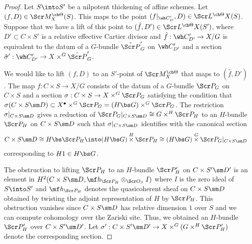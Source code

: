 \documentclass[final]{amsart}
\theoremstyle{remark}
\theoremstyle{definition}
\numberwithin{equation}{section}
\begin{document}
\begin{proof}
Let $S \into S'$ be a nilpotent thickening of affine schemes. 
Let $(f,D) \in \Scr M_X^{\ch\Theta}(S)$. 
This maps to the point $(f|_{\wh C'_D}, D) \in \Scr L^{\ch\Theta} X(S)$. 
Suppose that we have a lift of this point to 
$(\hat f, D') \in \Scr L^{\ch\Theta} X(S')$, where 
$D'\subset C\times S'$ is a relative effective Cartier divisor
and $\hat f: \wh C'_{D'} \to X/G$ is equivalent to 
the datum of a $G$-bundle $\hat{\Scr P}'_G$ on $\wh C'_{D'}$
and a section $\hat \sigma' : \wh C'_{D'} \to X \times^G \hat{\Scr P}'_G$.

We would like to lift $(f,D)$ to an $S'$-point of $\Scr M_X^{\ch\Theta}$
that maps to $(\hat f,D')$.
The map $f : C\times S \to X/G$
consists of the datum of a $G$-bundle $\Scr P_G$ on $C\times S$
and a section $\sigma : C\times S \to X \times^G \Scr P_G$
satisfying the condition that $\sigma(C\times S \sm D) \subset X^\bullet \times^G \Scr P_G = (H\bs G)\times^G \Scr P_G$.
The restriction $\sigma|_{C \times S \sm D}$ 
gives a reduction of $\Scr P_G|_{C\times S\sm D} \cong G\times^H \Scr P_H$ to an
$H$-bundle $\Scr P_H$ on $C\times S \sm D$ such that
$\sigma|_{C\times S\sm D}$ identifies with
the canonical section 
\[ C\times S \sm D \cong H\bs \Scr P_H \into (H\bs G)\overset H\times \Scr P_H \cong (H\bs G) \overset G\times \Scr P_G|_{C\times S \sm D}\]
corresponding to $H1\in H\bs G$.

The obstruction to lifting $\Scr P_H$ to an $H$-bundle $\Scr P'_H$ on $C\times S' \sm D'$ is an element in $H^2(C\times S\sm D, \mf h_{\Scr P_H} \otimes_{\Scr O_S} I)$ where $I$
is the zero ideal of $S\into S'$ and $\mf h_{\Scr P_H}$ denotes the quasicoherent sheaf on $C\times S \sm D$ obtained
by twisting the adjoint representation of $H$ by $\Scr P_H$.
This obstruction vanishes since $C\times S \sm D$ has
relative dimension $1$ over $S$ and we can compute
cohomology over the Zariski site. 
Thus, we obtained an $H$-bundle $\Scr P'_H$ over $C\times S' \sm D'$.
Let $\sigma' : C\times S'\sm D' \to X \times^G (G\times^H\Scr P'_H)$ denote the corresponding section.


\end{proof}
\end{document}
